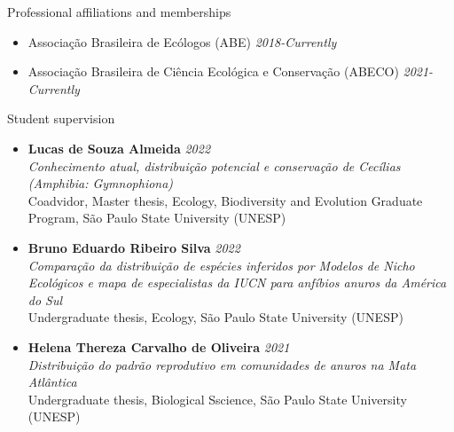 \documentclass{resume}
\begin{document}

\begin{rSection}{Professional affiliations and memberships}
\begin{itemize}
\item Associação Brasileira de Ecólogos (ABE) \hfill{\em 2018-Currently}
\item Associação Brasileira de Ciência Ecológica e Conservação (ABECO) \hfill{\em 2021-Currently}
\end{itemize}
\end{rSection}


\begin{rSection}{Student supervision}
\begin{itemize}
\item {\bf Lucas de Souza Almeida} \hfill{\em 2022} 
\\ {\it Conhecimento atual, distribuição potencial e conservação de Cecílias (Amphibia: Gymnophiona)} 
\\ Coadvidor, Master thesis, Ecology, Biodiversity and Evolution Graduate Program, São Paulo State University (UNESP)

\item {\bf Bruno Eduardo Ribeiro Silva} \hfill{\em 2022} 
\\ {\it Comparação da distribuição de espécies inferidos por Modelos de Nicho Ecológicos e mapa de especialistas da IUCN para anfíbios anuros da América do Sul} 
\\ Undergraduate thesis, Ecology, São Paulo State University (UNESP)

\item {\bf Helena Thereza Carvalho de Oliveira} \hfill{\em 2021} 
\\ {\it Distribuição do padrão reprodutivo em comunidades de anuros na Mata Atlântica} 
\\ Undergraduate thesis, Biological Sscience, São Paulo State University (UNESP)
\end{itemize}
\end{rSection}

\end{document}
